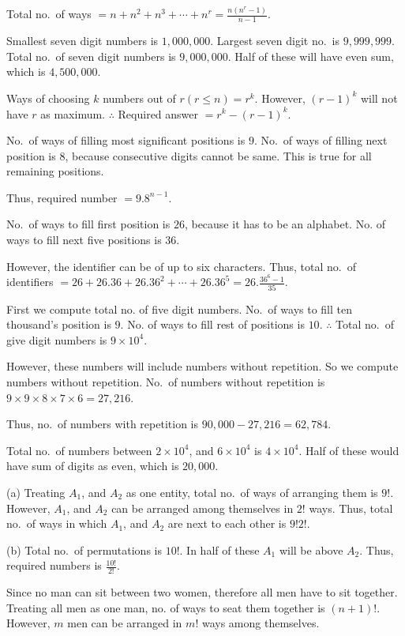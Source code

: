   Total no.\ of ways $= n + n^2 + n^3 + \cdots + n^r = \frac{n(n^r - 1)}{n - 1}$.
\item Smallest seven digit numbers is $1,000,000$. Largest seven digit no.\ is $9,999,999$. Total no.\ of
  seven digit numbers is $9,000,000$. Half of these will have even sum, which is $4,500,000$.
\item Ways of choosing $k$ numbers out of $r(r\leq n) = r^k$. However, $(r - 1)^k$ will not have $r$ as
  maximum. $\therefore$ Required answer $= r^k - (r - 1)^k$.
\item No.\ of ways of filling most significant positions is $9$. No.\ of ways of filling next position is
  $8$, because consecutive digits cannot be same. This is true for all remaining positions.

  Thus, required number $= 9.8^{n - 1}$.
\item No.\ of ways to fill first position is $26$, because it has to be an alphabet. No. of ways to fill
  next five positions is $36$.

  However, the identifier can be of up to six characters. Thus, total no.\ of identifiers $= 26 + 26.36 +
  26.36^2 + \cdots + 26.36^5 = 26.\frac{36^6 - 1}{35}$.
\item First we compute total no. of five digit numbers. No.\ of ways to fill ten thousand's position is
  $9$. No. of ways to fill rest of positions is $10$. $\therefore$ Total no.\ of give digit numbers is
  $9\times10^4$.

  However, these numbers will include numbers without repetition. So we compute numbers without
  repetition. No.\ of numbers without repetition is $9\times9\times8\times7\times6 = 27,216$.

  Thus, no.\ of numbers with repetition is $90,000 - 27,216 = 62,784$.
\item Total no.\ of numbers between $2\times10^4$, and $6\times10^4$ is $4\times10^4$. Half of these would
  have sum of digits as even, which is $20,000$.
\item (a) Treating $A_1$, and $A_2$ as one entity, total no.\ of ways of arranging them is $9!$. However,
  $A_1$, and $A_2$ can be arranged among themselves in $2!$ ways. Thus, total no.\ of ways in which $A_1$,
  and $A_2$ are next to each other is $9!2!$.

  (b) Total no.\ of permutations is $10!$. In half of these $A_1$ will be above $A_2$. Thus, required
  numbers is $\frac{10!}{2!}$.
\item Since no man can sit between two women, therefore all men have to sit together. Treating all men as
  one man, no. of ways to seat them together is $(n + 1)!$. However, $m$ men can be arranged in $m!$ ways
  among themselves.

